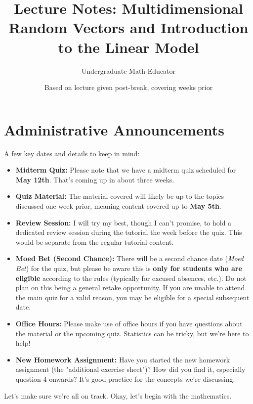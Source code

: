 \documentclass[11pt]{article}
\theoremstyle{definition}
\begin{document}
\title{Lecture Notes: Multidimensional Random Vectors and Introduction to the Linear Model}
\author{Undergraduate Math Educator} %
\date{Based on lecture given post-break, covering weeks prior}
\maketitle

\section*{Administrative Announcements}
\label{sec:admin}

A few key dates and details to keep in mind:

\begin{itemize}
    \item \textbf{Midterm Quiz:} Please note that we have a midterm quiz scheduled for \textbf{May 12th}. That's coming up in about three weeks.
    \item \textbf{Quiz Material:} The material covered will likely be up to the topics discussed one week prior, meaning content covered up to \textbf{May 5th}.
    \item \textbf{Review Session:} I will try my best, though I can't promise, to hold a dedicated review session during the tutorial the week before the quiz. This would be separate from the regular tutorial content.
    \item \textbf{Moed Bet (Second Chance):} There will be a second chance date (\textit{Moed Bet}) for the quiz, but please be aware this is \textbf{only for students who are eligible} according to the rules (typically for excused absences, etc.). Do not plan on this being a general retake opportunity. If you are unable to attend the main quiz for a valid reason, you may be eligible for a special subsequent date.
    \item \textbf{Office Hours:} Please make use of office hours if you have questions about the material or the upcoming quiz. Statistics can be tricky, but we're here to help!
    \item \textbf{New Homework Assignment:} Have you started the new homework assignment (the "additional exercise sheet")? How did you find it, especially question 4 onwards? It's good practice for the concepts we're discussing.
\end{itemize}

Let's make sure we're all on track. Okay, let's begin with the mathematics.
\end{document}
